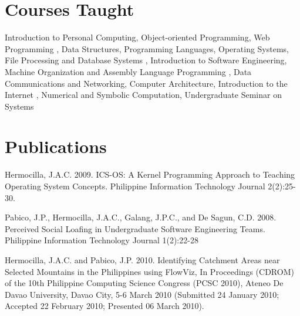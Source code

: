 \documentclass[overlapped,line,letterpaper]{res}
\begin{document}
\begin{resume}
%
%

\section{\bf Courses Taught}
Introduction to Personal Computing, Object-oriented Programming, Web Programming
, Data Structures, Programming Languages, Operating Systems, File Processing and Database Systems
, Introduction to Software Engineering, Machine Organization and Assembly Language Programming
, Data Communications and Networking, Computer Architecture, Introduction to the Internet
, Numerical and Symbolic Computation, Undergraduate Seminar on Systems

\section{\bf Publications}
Hermocilla, J.A.C. 2009. ICS-OS: A Kernel Programming Approach to Teaching Operating System Concepts. Philippine Information Technology Journal 2(2):25-30.

Pabico, J.P., Hermocilla, J.A.C., Galang, J.P.C., and De Sagun, C.D. 2008. Perceived Social Loafing in Undergraduate Software Engineering Teams. Philippine Information Technology Journal 1(2):22-28

Hermocilla, J.A.C. and Pabico, J.P. 2010. Identifying Catchment Areas near Selected Mountains in the Philippines using FlowViz, In Proceedings (CDROM) of the 10th Philippine Computing Science Congress (PCSC 2010), Ateneo De Davao University, Davao City, 5-6 March 2010 (Submitted 24 January 2010; Accepted 22 February 2010; Presented 06 March 2010).


\end{resume}
\end{document}
